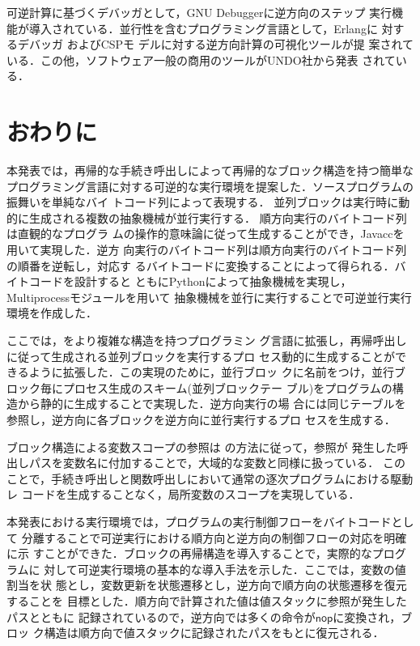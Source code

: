 \documentclass[submit,PRO]{ipsj}
\newcommand{\bcode}[1]{$\mathsf{#1}$}
\begin{document}
可逆計算に基づくデバッガとして，GNU Debugger\cite{GDB}に逆方向のステップ
実行機能が導入されている．並行性を含むプログラミング言語として，Erlangに
対するデバッガ
\cite{DBLP:conf/flops/Lanese0PV18,DBLP:conf/forte/LanesePV19}およびCSPモ
デルに対する逆方向計算の可視化ツール\cite{DBLP:conf/rc/Galindo0ST20}が提
案されている．この他，ソフトウェア一般の商用のツールがUNDO社から発表
\cite{UNDODebugger}されている．

\section{おわりに}

本発表では，再帰的な手続き呼出しによって再帰的なブロック構造を持つ簡単な
プログラミング言語に対する可逆的な実行環境を提案した．ソースプログラムの
振舞いを単純なバイ
トコード列によって表現する．
並列ブロックは実行時に動的に生成される複数の抽象機械が並行実行する．
順方向実行のバイトコード列は直観的なプログラ
ムの操作的意味論に従って生成することができ，Javaccを用いて実現した．逆方
向実行のバイトコード列は順方向実行のバイトコード列の順番を逆転し，対応す
るバイトコードに変換することによって得られる．バイトコードを設計すると
ともにPythonによって抽象機械を実現し，Multiprocessモジュールを用いて
抽象機械を並行に実行することで可逆並行実行環境を作成した．

ここでは，\cite{DBLP:conf/rc/IkedaY20}をより複雑な構造を持つプログラミン
グ言語に拡張し，再帰呼出しに従って生成される並列ブロックを実行するプロ
セス動的に生成することができるように拡張した．この実現のために，並行ブロッ
クに名前をつけ，並行ブロック毎にプロセス生成のスキーム(並列ブロックテー
ブル)をプログラムの構造から静的に生成することで実現した．逆方向実行の場
合には同じテーブルを参照し，逆方向に各ブロックを逆方向に並行実行するプロ
セスを生成する．

ブロック構造による変数スコープの参照は
\cite{DBLP:journals/corr/abs-1808-08651,Hoey20PHD}の方法に従って，参照が
発生した呼出しパスを変数名に付加することで，大域的な変数と同様に扱っている．
このことで，手続き呼出しと関数呼出しにおいて通常の逐次プログラムにおける駆動レ
コードを生成することなく，局所変数のスコープを実現している．

本発表における実行環境では，プログラムの実行制御フローをバイトコードとして
分離することで可逆実行における順方向と逆方向の制御フローの対応を明確に示
すことができた．ブロックの再帰構造を導入することで，実際的なプログラムに
対して可逆実行環境の基本的な導入手法を示した．ここでは，変数の値割当を状
態とし，変数更新を状態遷移とし，逆方向で順方向の状態遷移を復元することを
目標とした．順方向で計算された値は値スタックに参照が発生したパスとともに
記録されているので，逆方向では多くの命令が\bcode{nop}に変換され，ブロッ
ク構造は順方向で値スタックに記録されたパスをもとに復元される．
\end{document}
